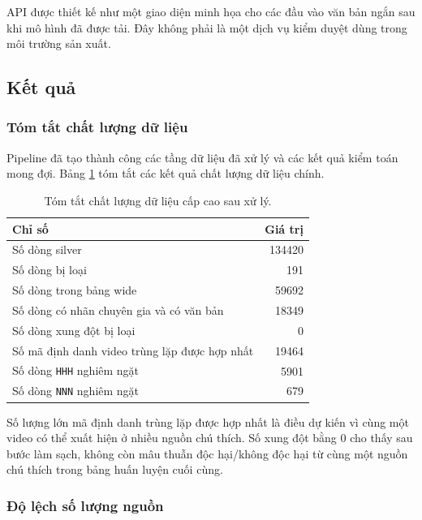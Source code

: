 API được thiết kế như một giao diện minh họa cho các đầu vào văn bản ngắn sau khi mô hình đã được tải. Đây không phải là một dịch vụ kiểm duyệt dùng trong môi trường sản xuất.

\subsection{Kết quả}

\subsubsection{Tóm tắt chất lượng dữ liệu}

Pipeline đã tạo thành công các tầng dữ liệu đã xử lý và các kết quả kiểm toán mong đợi. Bảng \ref{tab:implementation-data-quality-summary} tóm tắt các kết quả chất lượng dữ liệu chính.

\begin{table}[H]
\centering
\small
\renewcommand{\arraystretch}{1.25}
\begin{tabular}{|l|r|}
\hline
\textbf{Chỉ số} & \textbf{Giá trị} \\
\hline
Số dòng silver & 134420 \\
\hline
Số dòng bị loại & 191 \\
\hline
Số dòng trong bảng wide & 59692 \\
\hline
Số dòng có nhãn chuyên gia và có văn bản & 18349 \\
\hline
Số dòng xung đột bị loại & 0 \\
\hline
Số mã định danh video trùng lặp được hợp nhất & 19464 \\
\hline
Số dòng \texttt{HHH} nghiêm ngặt & 5901 \\
\hline
Số dòng \texttt{NNN} nghiêm ngặt & 679 \\
\hline
\end{tabular}
\caption{Tóm tắt chất lượng dữ liệu cấp cao sau xử lý.}
\label{tab:implementation-data-quality-summary}
\end{table}

Số lượng lớn mã định danh trùng lặp được hợp nhất là điều dự kiến vì cùng một video có thể xuất hiện ở nhiều nguồn chú thích. Số xung đột bằng 0 cho thấy sau bước làm sạch, không còn mâu thuẫn độc hại/không độc hại từ cùng một nguồn chú thích trong bảng huấn luyện cuối cùng.

\subsubsection{Độ lệch số lượng nguồn}

